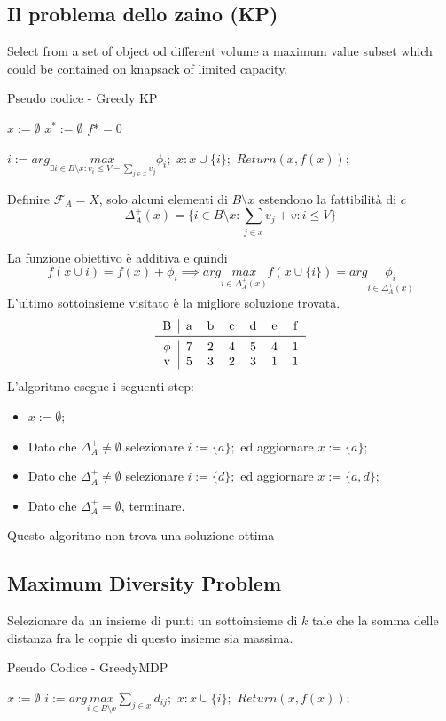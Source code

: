\documentclass{article}
\begin{document}
\subsection{Il problema dello zaino (KP)}
Select from a set of object od different volume a maximum value subset which could be contained
on knapsack of limited capacity.
\begin{algorithm}[H]
    \caption{Pseudo codice - Greedy KP}
    \begin{algorithmic}
        \State $x:=\emptyset$
        \State $x^*:=\emptyset$
        \State $f*=0$

        \State $i:=arg\underset{\exists i \in B\setminus x :v_i\leq V-\sum_{j\in x}v_j}{max}\phi_i;$
        \State $x:x\cup\{i\};$
        \EndWhile
        \State $Return(x,f(x));$
    \end{algorithmic}
\end{algorithm}
Definire $\mathcal{F}_A = X$, solo alcuni elementi di $B\setminus x$ estendono la fattibilità di $c$
$$\Delta_A^+(x)=\{i\in B\setminus x:\sum_{j\in x}v_j+v : i \leq V\}$$

La funzione obiettivo è additiva e quindi
$$f(x\cup{i})=f(x)+\phi_i\implies arg\underset{i\in\Delta_A^+(x)}{max}f(x\cup\{i\})=arg\underset{i\in\Delta_A^+(x)}{\phi_i}$$
L'ultimo sottoinsieme visitato è la migliore soluzione trovata.
\[
    \begin{tabular}{c | c c c c c c c}
        B      & a & b & c & d & e & f \\
        \midrule
        $\phi$ & 7 & 2 & 4 & 5 & 4 & 1 \\
        v      & 5 & 3 & 2 & 3 & 1 & 1 \\
    \end{tabular}
\]
L'algoritmo esegue i seguenti step:
\begin{itemize}
    \item $x:=\emptyset;$
    \item Dato che $\Delta_A^+\neq\emptyset$ selezionare $i:=\{a\};$ ed aggiornare $x:=\{a\};$
    \item Dato che $\Delta_A^+\neq\emptyset$ selezionare $i:=\{d\};$ ed aggiornare $x:=\{a,d\};$
    \item Dato che $\Delta_A^+ = \emptyset$, terminare.
\end{itemize}
Questo algoritmo non trova una soluzione ottima
\subsection{Maximum Diversity Problem}
Selezionare da un insieme di punti un sottoinsieme di $k$ tale che la somma delle distanza
fra le coppie di questo insieme sia massima.
\begin{algorithm}[H]
    \caption{Pseudo Codice - GreedyMDP}
    \begin{algorithmic}
        \State $x:=\emptyset$
        \State $i:=arg\underset{i \in B\setminus x}{max}\sum_{j\in x}d_{ij};$
        \State $x:x\cup\{i\};$
        \EndWhile
        \State $Return(x,f(x));$
    \end{algorithmic}
\end{algorithm}
\end{document}

